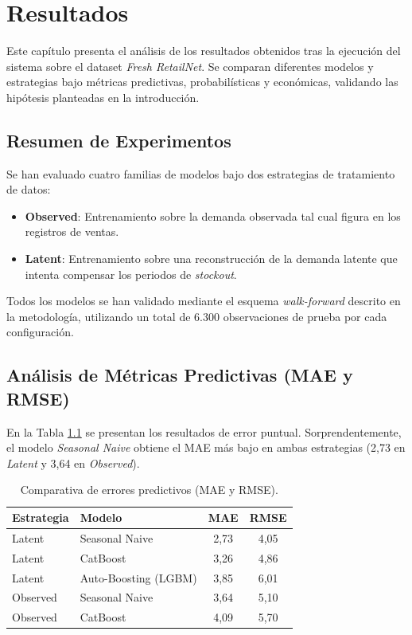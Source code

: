 \chapter{Resultados}
\label{chap:resultados}

Este capítulo presenta el análisis de los resultados obtenidos tras la ejecución del sistema sobre el dataset \textit{Fresh RetailNet}. Se comparan diferentes modelos y estrategias bajo métricas predictivas, probabilísticas y económicas, validando las hipótesis planteadas en la introducción.

\section{Resumen de Experimentos}
Se han evaluado cuatro familias de modelos bajo dos estrategias de tratamiento de datos:
\begin{itemize}
    \item \textbf{Observed}: Entrenamiento sobre la demanda observada tal cual figura en los registros de ventas.
    \item \textbf{Latent}: Entrenamiento sobre una reconstrucción de la demanda latente que intenta compensar los periodos de \textit{stockout}.
\end{itemize}

Todos los modelos se han validado mediante el esquema \textit{walk-forward} descrito en la metodología, utilizando un total de 6.300 observaciones de prueba por cada configuración.

\section{Análisis de Métricas Predictivas (MAE y RMSE)}
En la Tabla \ref{tab:metrics_predictive} se presentan los resultados de error puntual. Sorprendentemente, el modelo \textit{Seasonal Naive} obtiene el MAE más bajo en ambas estrategias (2,73 en \textit{Latent} y 3,64 en \textit{Observed}).

\begin{table}[h]
\centering
\begin{tabular}{@{}llcc@{}}
\toprule
\textbf{Estrategia} & \textbf{Modelo} & \textbf{MAE} & \textbf{RMSE} \\ \midrule
Latent & Seasonal Naive & 2,73 & 4,05 \\
Latent & CatBoost & 3,26 & 4,86 \\
Latent & Auto-Boosting (LGBM) & 3,85 & 6,01 \\ \midrule
Observed & Seasonal Naive & 3,64 & 5,10 \\
Observed & CatBoost & 4,09 & 5,70 \\
\bottomrule
\end{tabular}
\caption{Comparativa de errores predictivos (MAE y RMSE).}
\label{tab:metrics_predictive}
\end{table}

